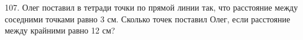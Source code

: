 107. Олег поставил в тетради точки по прямой линии так, что расстояние между соседними точками равно 3 см. Сколько точек поставил Олег, если расстояние между крайними равно 12 см?\\
